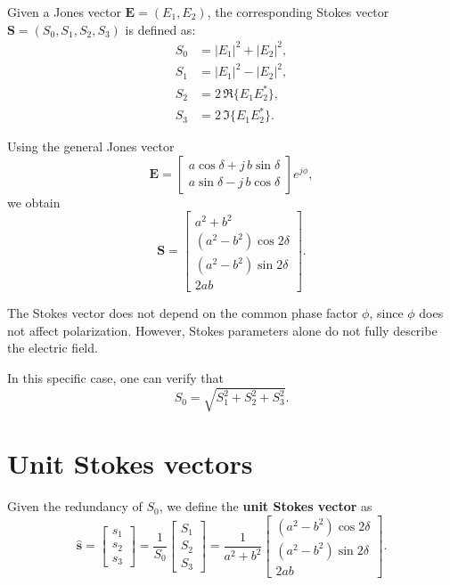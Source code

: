 Given a Jones vector $\mathbf{E} = (E_1, E_2)$,  
the corresponding Stokes vector $\mathbf{S} = (S_0, S_1, S_2, S_3)$ is defined as:
\begin{align}
    S_0 &= |E_1|^2 + |E_2|^2,\\
    S_1 &= |E_1|^2 - |E_2|^2,\\
    S_2 &= 2\,\Re\{E_1 E_2^*\},\\
    S_3 &= 2\,\Im\{E_1 E_2^*\}.
\end{align}

Using the general Jones vector
\[
\mathbf{E} =
\begin{bmatrix}
    a\cos\delta + j\,b\sin\delta\\
    a\sin\delta - j\,b\cos\delta
\end{bmatrix} e^{j\phi},
\]
we obtain
\begin{equation}
    \mathbf{S} =
    \begin{bmatrix}
        a^2 + b^2\\
        (a^2 - b^2)\cos 2\delta\\
        (a^2 - b^2)\sin 2\delta\\
        2ab
    \end{bmatrix}.
\end{equation}

\medskip
The Stokes vector does not depend on the common phase factor $\phi$, since $\phi$ does not affect polarization.  
However, Stokes parameters alone do not fully describe the electric field.

\medskip
In this specific case, one can verify that
\begin{equation}
    S_0 = \sqrt{S_1^2 + S_2^2 + S_3^2}.
\end{equation}



\section{Unit Stokes vectors}

Given the redundancy of $S_0$, we define the \textbf{unit Stokes vector} as
\begin{equation}
    \hat{\mathbf{s}} =
    \begin{bmatrix}
        s_1 \\ s_2 \\ s_3
    \end{bmatrix}
    =
    \frac{1}{S_0}
    \begin{bmatrix}
        S_1 \\ S_2 \\ S_3
    \end{bmatrix}
    =
    \frac{1}{a^2 + b^2}
    \begin{bmatrix}
        (a^2 - b^2)\cos 2\delta\\[4pt]
        (a^2 - b^2)\sin 2\delta\\[4pt]
        2ab
    \end{bmatrix}.
\end{equation}

